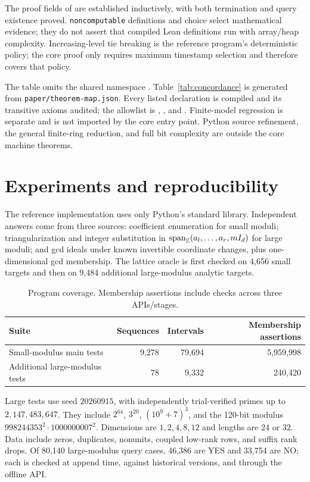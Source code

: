 \documentclass[11pt,a4paper]{article}
\theoremstyle{definition}
\theoremstyle{plain}
\begin{document}
The proof fields of  are established inductively, with both termination and
query existence proved. \texttt{noncomputable} definitions and choice select mathematical evidence;
they do not assert that compiled Lean definitions run with array/heap complexity. Increasing-level
tie breaking is the reference program's deterministic policy; the core proof only requires maximum
timestamp selection and therefore covers that policy.

The table omits the shared namespace .
Table~\ref{tab:concordance} is generated from \texttt{paper/theorem-map.json}. Every listed
declaration is compiled and its transitive axioms audited; the allowlist is
, , and . Finite-model regression is separate
and is not imported by the core entry point. Python source refinement, the general finite-ring
reduction, and full bit complexity are outside the core machine theorems.


\section{Experiments and reproducibility}
The reference implementation uses only Python's standard library. Independent answers come from
three sources: coefficient enumeration for small moduli; triangularization and integer substitution
in $\operatorname{span}_\mathbb Z(a_l,\ldots,a_r,mI_d)$ for large moduli; and gcd ideals under known invertible coordinate
changes, plus one-dimensional gcd membership. The lattice oracle is first checked on 4,656 small
targets and then on 9,484 additional large-modulus analytic targets.

\begin{table}[htbp]
\centering
\caption{Program coverage. Membership assertions include checks across three APIs/stages.}\label{tab:tests}
\begin{tabular}{lrrr}
\toprule
Suite & Sequences & Intervals & Membership assertions\\
\midrule
Small-modulus main tests & 9,278 & 79,694 & 5,959,998\\
Additional large-modulus tests & 78 & 9,332 & 240,420\\
\bottomrule
\end{tabular}
\end{table}

Large tests use seed $20260915$, with independently trial-verified primes up to $2,147,483,647$.
They include $2^{64}$, $3^{20}$, $(10^9+7)^3$, and the 120-bit modulus
$998244353^2\cdot1000000007^2$. Dimensions are $1,2,4,8,12$ and lengths are $24$ or $32$.
Data include zeros, duplicates, nonunits, coupled low-rank rows, and suffix rank drops.
Of 80,140 large-modulus query cases, 46,386 are YES and 33,754 are NO; each is checked at append
time, against historical versions, and through the offline API.
\end{document}
